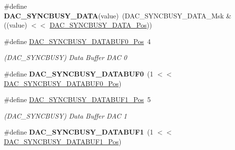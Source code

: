 \begin{DoxyCompactItemize}
\item 
\hypertarget{group___s_a_m_l21___d_a_c_ga3f08dfd94ed712d8edef6231fe7775e5}{}\#define {\bfseries D\+A\+C\+\_\+\+S\+Y\+N\+C\+B\+U\+S\+Y\+\_\+\+D\+A\+T\+A}(value)~(D\+A\+C\+\_\+\+S\+Y\+N\+C\+B\+U\+S\+Y\+\_\+\+D\+A\+T\+A\+\_\+\+Msk \& ((value) $<$$<$ \hyperlink{group___s_a_m_l21___d_a_c_ga2c7fa799e63254f6fe31997f8d74ab69}{D\+A\+C\+\_\+\+S\+Y\+N\+C\+B\+U\+S\+Y\+\_\+\+D\+A\+T\+A\+\_\+\+Pos}))\label{group___s_a_m_l21___d_a_c_ga3f08dfd94ed712d8edef6231fe7775e5}

\item 
\hypertarget{group___s_a_m_l21___d_a_c_gabcfee0c9deae7256c79904ede1fb80f3}{}\#define \hyperlink{group___s_a_m_l21___d_a_c_gabcfee0c9deae7256c79904ede1fb80f3}{D\+A\+C\+\_\+\+S\+Y\+N\+C\+B\+U\+S\+Y\+\_\+\+D\+A\+T\+A\+B\+U\+F0\+\_\+\+Pos}~4\label{group___s_a_m_l21___d_a_c_gabcfee0c9deae7256c79904ede1fb80f3}

\begin{DoxyCompactList}\small\item\em (D\+A\+C\+\_\+\+S\+Y\+N\+C\+B\+U\+S\+Y) Data Buffer D\+A\+C 0 \end{DoxyCompactList}\item 
\hypertarget{group___s_a_m_l21___d_a_c_ga445380e41519269e114e0e4a49a24293}{}\#define {\bfseries D\+A\+C\+\_\+\+S\+Y\+N\+C\+B\+U\+S\+Y\+\_\+\+D\+A\+T\+A\+B\+U\+F0}~(1 $<$$<$ \hyperlink{group___s_a_m_l21___d_a_c_gabcfee0c9deae7256c79904ede1fb80f3}{D\+A\+C\+\_\+\+S\+Y\+N\+C\+B\+U\+S\+Y\+\_\+\+D\+A\+T\+A\+B\+U\+F0\+\_\+\+Pos})\label{group___s_a_m_l21___d_a_c_ga445380e41519269e114e0e4a49a24293}

\item 
\hypertarget{group___s_a_m_l21___d_a_c_gaf33c0e2294a830ae02a2fa7b8ace4080}{}\#define \hyperlink{group___s_a_m_l21___d_a_c_gaf33c0e2294a830ae02a2fa7b8ace4080}{D\+A\+C\+\_\+\+S\+Y\+N\+C\+B\+U\+S\+Y\+\_\+\+D\+A\+T\+A\+B\+U\+F1\+\_\+\+Pos}~5\label{group___s_a_m_l21___d_a_c_gaf33c0e2294a830ae02a2fa7b8ace4080}

\begin{DoxyCompactList}\small\item\em (D\+A\+C\+\_\+\+S\+Y\+N\+C\+B\+U\+S\+Y) Data Buffer D\+A\+C 1 \end{DoxyCompactList}\item 
\hypertarget{group___s_a_m_l21___d_a_c_gaa645f84e37aabf255ea99f1fc6d45098}{}\#define {\bfseries D\+A\+C\+\_\+\+S\+Y\+N\+C\+B\+U\+S\+Y\+\_\+\+D\+A\+T\+A\+B\+U\+F1}~(1 $<$$<$ \hyperlink{group___s_a_m_l21___d_a_c_gaf33c0e2294a830ae02a2fa7b8ace4080}{D\+A\+C\+\_\+\+S\+Y\+N\+C\+B\+U\+S\+Y\+\_\+\+D\+A\+T\+A\+B\+U\+F1\+\_\+\+Pos})\label{group___s_a_m_l21___d_a_c_gaa645f84e37aabf255ea99f1fc6d45098}


\end{DoxyCompactItemize}
